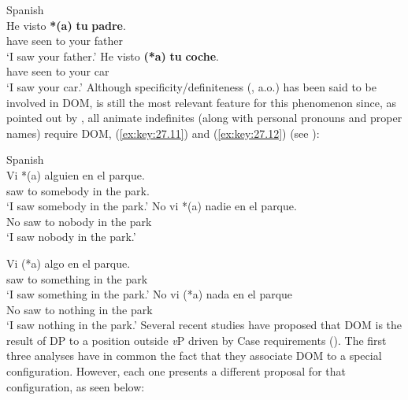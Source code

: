 \documentclass[output=paper]{langsci/langscibook}
\begin{document}
\ea\label{ex:key:27.10} Spanish\\
    \ea
        \gll He     visto \textbf{*(a)} \textbf{tu} \textbf{padre}.\\
        have  seen   \hphantom{\textbf{*(}}to   your   father\\
        \glt `I saw your father.'
    \ex
        \gll He     visto \textbf{(*a)} \textbf{tu} \textbf{coche}.\\
            have  seen     \hphantom{\textbf{*(}}to  your car\\
        \glt `I saw your car.'
    \z
\z
Although specificity/definiteness (\citealt{Leonetti2004,Lopez2012}, a.o.) has
been said to be involved in DOM, 
is still the most relevant feature for this phenomenon since, as pointed out by
\citet{Rodriguez-Mondonedo2007}, all animate indefinites (along with personal
pronouns and proper names) require DOM,
(\ref{ex:key:27.11}) and (\ref{ex:key:27.12}) (see
\citealt{Rodriguez-Mondonedo2007}):

\ea\label{ex:key:27.11} Spanish\\
    \ea
        \gll Vi *(a) alguien en el parque.\\
        saw \hphantom{*(}to somebody in the park.\\
        \glt `I saw somebody in the park.'
    \ex No vi *(a) nadie en el parque.\\
            No saw \hphantom{*(}to nobody in the park\\
        \glt `I saw nobody in the park.'
    \z
\z\newpage

\ea\label{ex:key:27.12} 
    \ea
        \gll Vi (*a) algo en el parque.\\
               saw \hphantom{*(}to something in the park\\
        \glt `I saw something in the park.'
    \ex
        \gll No vi (*a) nada en el parque\\
            No saw \hphantom{*(}to nothing in the park\\
        \glt `I saw nothing in the park.'
    \z
\z
Several recent studies have proposed that DOM
is the result of DP  to a position outside \emph{v}P driven by Case
requirements (\citealt{Torrego1998,
Rodriguez-Mondonedo2007,Lopez2012,OrmazabalRomero2013,Zdrojewski2013,OrdonezRoca2017}).
The first three analyses have in common the fact that they associate
\gls{DOM} to a special configuration. However, each
one presents a different proposal for that configuration, as seen
below:
\end{document}
